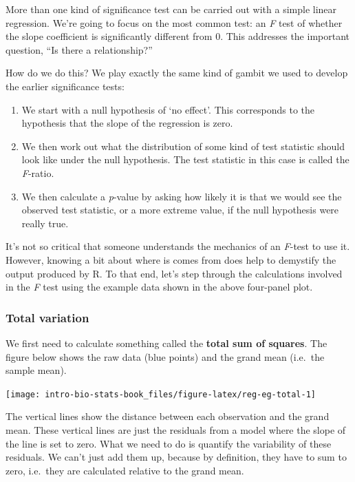 \documentclass[
]{book}
\begin{document}
More than one kind of significance test can be carried out with a simple linear regression. We're going to focus on the most common test: an \emph{F} test of whether the slope coefficient is significantly different from 0. This addresses the important question, ``Is there a relationship?''

How do we do this? We play exactly the same kind of gambit we used to develop the earlier significance tests:

\begin{enumerate}
\def\labelenumi{\arabic{enumi}.}
\item
  We start with a null hypothesis of `no effect'. This corresponds to the hypothesis that the slope of the regression is zero.
\item
  We then work out what the distribution of some kind of test statistic should look like under the null hypothesis. The test statistic in this case is called the \emph{F}-ratio.
\item
  We then calculate a \emph{p}-value by asking how likely it is that we would see the observed test statistic, or a more extreme value, if the null hypothesis were really true.
\end{enumerate}

It's not so critical that someone understands the mechanics of an \emph{F}-test to use it. However, knowing a bit about where is comes from does help to demystify the output produced by R. To that end, let's step through the calculations involved in the \emph{F} test using the example data shown in the above four-panel plot.

\hypertarget{total-variation}{%
\subsubsection*{Total variation}\label{total-variation}}

We first need to calculate something called the \textbf{total sum of squares}. The figure below shows the raw data (blue points) and the grand mean (i.e.~the sample mean).

\begin{center}\texttt{[image: intro-bio-stats-book\_files/figure-latex/reg-eg-total-1]} \end{center}

The vertical lines show the distance between each observation and the grand mean. These vertical lines are just the residuals from a model where the slope of the line is set to zero. What we need to do is quantify the variability of these residuals. We can't just add them up, because by definition, they have to sum to zero, i.e.~they are calculated relative to the grand mean.
\end{document}

